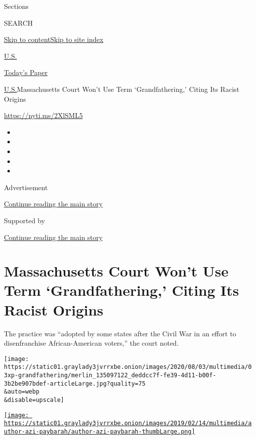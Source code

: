 Sections

SEARCH

\protect\hyperlink{site-content}{Skip to
content}\protect\hyperlink{site-index}{Skip to site index}

\href{https://www.nytimes3xbfgragh.onion/section/us}{U.S.}

\href{https://myaccount.nytimes3xbfgragh.onion/auth/login?response_type=cookie\&client_id=vi}{}

\href{https://www.nytimes3xbfgragh.onion/section/todayspaper}{Today's
Paper}

\href{/section/us}{U.S.}\textbar{}Massachusetts Court Won't Use Term
`Grandfathering,' Citing Its Racist Origins

\url{https://nyti.ms/2XlSML5}

\begin{itemize}
\item
\item
\item
\item
\item
\end{itemize}

Advertisement

\protect\hyperlink{after-top}{Continue reading the main story}

Supported by

\protect\hyperlink{after-sponsor}{Continue reading the main story}

\hypertarget{massachusetts-court-wont-use-term-grandfathering-citing-its-racist-origins}{%
\section{Massachusetts Court Won't Use Term `Grandfathering,' Citing Its
Racist
Origins}\label{massachusetts-court-wont-use-term-grandfathering-citing-its-racist-origins}}

The practice was ``adopted by some states after the Civil War in an
effort to disenfranchise African-American voters,'' the court noted.

\texttt{[image: https://static01.graylady3jvrrxbe.onion/images/2020/08/03/multimedia/03xp-grandfathering/merlin\_135097122\_deddcc7f-fe39-4d11-b00f-3b2be907bdef-articleLarge.jpg?quality=75\\\&auto=webp\\\&disable=upscale]}

\href{https://www.nytimes3xbfgragh.onion/by/azi-paybarah}{\texttt{[image: https://static01.graylady3jvrrxbe.onion/images/2019/02/14/multimedia/author-azi-paybarah/author-azi-paybarah-thumbLarge.png]}}


